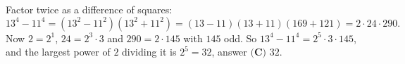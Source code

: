Factor twice as a difference of squares:
\[13^4-11^4=\left(13^2-11^2\right)\left(13^2+11^2\right)=(13-11)(13+11)\left(169+121\right)=2\cdot24\cdot290.\]
Now $2=2^1$, $24=2^3\cdot3$ and $290=2\cdot145$ with $145$ odd. So $13^4-11^4=2^5\cdot3\cdot145$, and the largest power of $2$ dividing it is $2^5=32$, answer $\boxed{\textbf{(C) }32}$.
